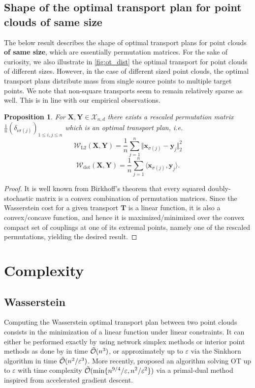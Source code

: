 \documentclass[letterpaper]{article} \usepackage{aaai22}  \usepackage{times}  \usepackage{helvet}  \usepackage{courier}  \usepackage[hyphens]{url}  \usepackage{graphicx} \urlstyle{rm} \def\UrlFont{\rm}  \usepackage{natbib}  \usepackage{caption} \DeclareCaptionStyle{ruled}{labelfont=normalfont,labelsep=colon,strut=off} \frenchspacing  \setlength{\pdfpagewidth}{8.5in}  \setlength{\pdfpageheight}{11in}  \usepackage{algorithm}
\newtheorem{proposition}{Proposition}
\newcommand{\x}{{\mathbf x}}
\newcommand{\T}{{\mathbf T}}
\newcommand{\X}{{\mathbf X}}
\newcommand{\Y}{{\mathbf Y}}
\newcommand{\Was}{{\mathcal W}}
\begin{document}
\subsection{Shape of the optimal transport plan for point clouds of same size}\label{sec:proof-permu}
The below result describes the shape of optimal transport plans for point clouds \textbf{of same size}, which are essentially permutation matrices. For the sake of curiosity, we also illustrate in \cref{fig:ot_dist} the optimal transport for point clouds of different sizes. However, in the case of different sized point clouds, the optimal transport plans distribute mass from single source points to multiple target points. We note that non-square transports seem to remain relatively sparse as well. This is in line with our empirical observations.

\begin{proposition}\label{thm:permu}
For $\X,\Y\in\mathcal{X}_{n,d}$ there exists a rescaled permutation matrix $\frac{1}{n}(\delta_{i\sigma(j)})_{1\leq i,j\leq n}$ which is an optimal transport plan, i.e. \begin{equation}
     \Was_{\mathrm{L2}}(\X,\Y) =\dfrac{1}n\sum_{j=1}^n\Vert\x_{\sigma(j)}-\mathbf{y}_j\Vert_2^2
 \end{equation}
 \begin{equation}
     \Was_{\mathrm{dot}}(\X,\Y) =\dfrac{1}n\sum_{j=1}^n\langle\x_{\sigma(j)},\mathbf{y}_j\rangle.
 \end{equation}
\end{proposition}
\begin{proof}
It is well known from Birkhoff's theorem that every squared doubly-stochastic matrix is a convex combination of permutation matrices. Since the Wasserstein cost for a given transport $\T$ is a linear function, it is also a convex/concave function, and hence it is maximized/minimized over the convex compact set of couplings at one of its extremal points, namely one of the rescaled permutations, yielding the desired result.
\end{proof}




\section{Complexity} \label{apx:complexities}
\subsection{Wasserstein}
Computing the Wasserstein optimal transport plan between two point clouds consists in the minimization of a linear function under linear constraints. It can either be performed exactly by using network simplex methods or interior point methods as done by \citep{pele2009fast} in time $\Tilde{\mathcal{O}}(n^3)$, or approximately up to $\varepsilon$ via the Sinkhorn algorithm \citep{cuturi2013sinkhorn} in time $\Tilde{\mathcal{O}}(n^2/\varepsilon^3)$. More recently, \citep{dvurechensky2018computational} proposed an algorithm solving OT up to $\varepsilon$ with time complexity $\Tilde{\mathcal{O}}(\min\{n^{9/4}/\varepsilon,n^2/\varepsilon^2\})$ via a primal-dual method inspired from accelerated gradient descent.
\end{document}
